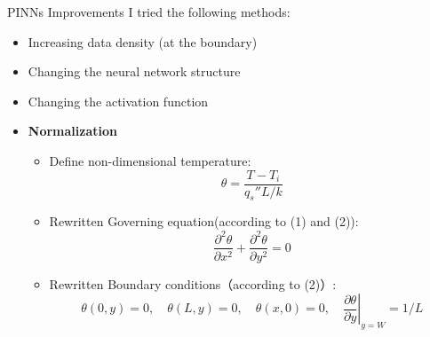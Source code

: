 \documentclass{beamer}
\begin{document}
\begin{frame}{PINNs Improvements}
I tried the following methods: 
\begin{itemize}
    \item Increasing data density (at the boundary)
    \item Changing the neural network structure
    \item Changing the activation function
    \item \textbf{Normalization}
    \begin{itemize}
        \item Define non-dimensional temperature:
            \begin{equation}
            \theta = \frac{T - T_i}{q_s'' L / k}
            \end{equation}
        \item Rewritten Governing equation(according to (1) and (2)):
            \begin{equation}
            \frac{\partial^2 \theta}{\partial x^2} + \frac{\partial^2 \theta}{\partial y^2} = 0
            \end{equation}
        \item Rewritten Boundary conditions（according to (2)）:
            \[
            \theta(0, y) = 0, \quad \theta(L, y) = 0, \quad \theta(x, 0) = 0,\quad \left. \frac{\partial \theta}{\partial y} \right|_{y=W} = 1/L
            \]
    \end{itemize}
\end{itemize}
\end{frame}
\end{document}
